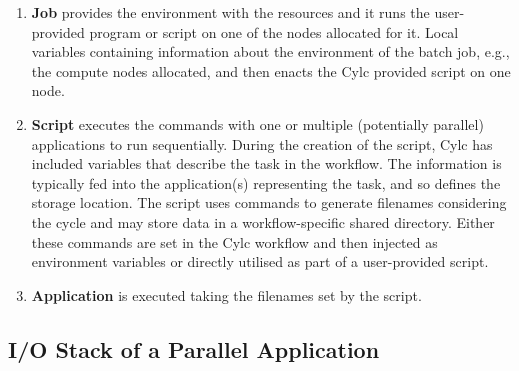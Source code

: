 \documentclass{superfri}
\begin{document}
\begin{enumerate}
  \item \textbf{Job} provides the environment with the resources and it runs the user-provided program or script on one of the nodes allocated for it.
  Local variables containing information about the environment of the batch job, e.g., the compute nodes allocated, and then enacts the Cylc provided script on one node.

  \item \textbf{Script} executes the commands with one or multiple (potentially parallel) applications to run sequentially.
  During the creation of the script, Cylc has included variables that describe the task in the workflow.
  The information is typically fed into the application(s) representing the task, and so defines the storage location.
  The script uses commands to generate filenames considering the cycle and may store data in a workflow-specific shared directory.
  Either these commands are set in the Cylc workflow and then injected as environment variables or directly utilised as part of a user-provided script.

  \item \textbf{Application} is executed taking the filenames set by the script.
\end{enumerate}

\subsection{I/O Stack of a Parallel Application}

\end{document}
